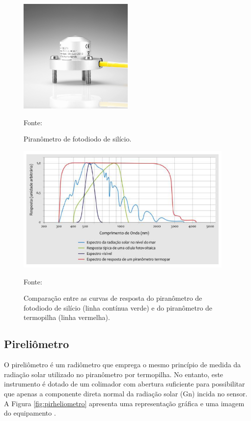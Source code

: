 \begin{figure}[H]
    \centering
    \includegraphics[width=0.5\textwidth]{./Figuras/pirometro_fotodiodo.jpg}
    \caption{ Piranômetro de fotodiodo de silício.}{Fonte: \cite{kippzonen}}
   \label{fig:pirometro_fotodiodo}
\end{figure}

\begin{figure}[H]
    \centering
    \includegraphics[width=0.95\textwidth]{./Figuras/pirometro_fotodiodo_graf.png}
    \caption{Comparação entre as curvas de resposta do piranômetro de fotodiodo de silício (linha contínua verde) e do piranômetro de termopilha (linha vermelha).}{Fonte: \cite{kippzonen}}
   \label{fig:pirometro_fotodiodo_graf}
\end{figure}

\subsection{Pireliômetro} \label{pireliometro}

O pireliômetro é um radiômetro que emprega o mesmo princípio de medida da radiação solar utilizado no piranômetro por termopilha. No entanto, este instrumento é dotado de um colimador com abertura suficiente para possibilitar que apenas a componente direta normal da radiação solar (Gn) incida no sensor. A Figura \ref{fig:pirheliometro} apresenta uma representação gráfica e uma imagem do equipamento \cite{atlas2017}.


